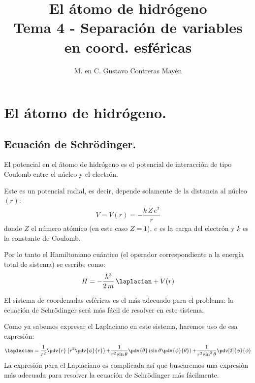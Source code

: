 
\title{El átomo de hidrógeno \\ \large {Tema 4 - Separación de variables en coord. esféricas}\vspace{-3ex}}

\author{M. en C. Gustavo Contreras Mayén}
\date{ }

\pagestyle{fancy}
\fancyhf{}
\lhead{\leftmark}
\rfoot{\thepage}
\setlength{\headheight}{16pt}%



\maketitle
\fontsize{14}{14}\selectfont
\tableofcontents
\newpage


\section{El átomo de hidrógeno.}
\subsection{Ecuación de Schrödinger.}

El potencial en el átomo de hidrógeno es el potencial de interacción de tipo Coulomb entre el núcleo y el electrón.
\par
Este es un potencial radial, es decir, depende solamente de la distancia al núcleo $(r)$:
\begin{align}
V = V(r) = - \dfrac{k \, Z \, e^{2}}{r}
\label{eq:ecuacion_01}
\end{align}
donde $Z$ el número atómico (en este caso $Z=1$), $e$ es la carga del electrón y $k$ es la constante de Coulomb.
\par
Por lo tanto el Hamiltoniano cuántico (el operador correspondiente a la energía total de sistema) se escribe como:
\begin{align}
H = - \dfrac{\hbar^{2}}{2 \, m} \, \laplacian + V(r)
\label{eq:ecuacion_02} 
\end{align}

El sistema de coordenadas esféricas es el más adecuado para el problema: la ecuación de Schrödinger será más fácil de resolver en este sistema.
\par
Como ya sabemos expresar el Laplaciano en este sistema, haremos uso de esa expresión:
\begin{align*}
\laplacian = \dfrac{1}{r^{2}} \pdv{r} \left( r^{2} \pdv{\phi}{r} \right) {+} \dfrac{1}{r^{2} \sin \theta} \pdv{\theta} \left( \sin \theta \pdv{\phi}{\theta} \right) {+} \dfrac{1}{r^{2} \sin^{2} \theta} \pdv[2]{\phi}{\phi} 
\end{align*}
La expresión para el Laplaciano es complicada así que buscaremos una expresión más adecuada para resolver la ecuación de Schrödinger más fácilmente.

